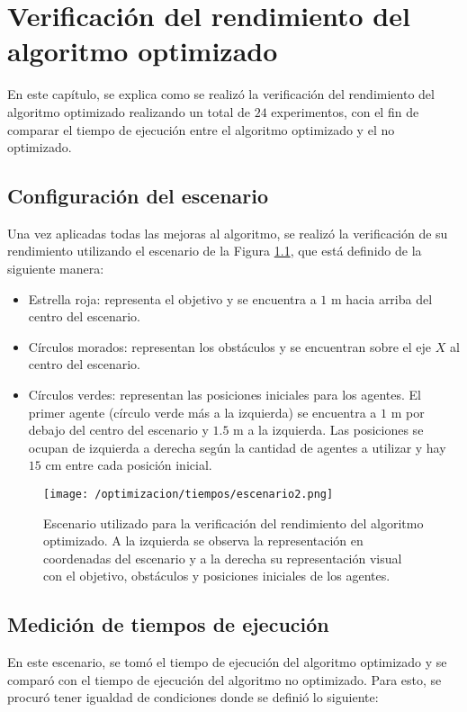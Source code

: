 \chapter{Verificación del rendimiento del algoritmo optimizado} \label{cap:verificacion_optim}
En este capítulo, se explica como se realizó la verificación del rendimiento del algoritmo optimizado realizando un total de $24$ experimentos, con el fin de comparar el tiempo de ejecución entre el algoritmo optimizado y el no optimizado.

\section{Configuración del escenario}
Una vez aplicadas todas las mejoras al algoritmo, se realizó la verificación de su rendimiento utilizando el escenario de la Figura \ref{fig:escenario_optimizacion}, que está definido de la siguiente manera:
\begin{itemize}
	\item Estrella roja: representa el objetivo y se encuentra a $1$ m hacia arriba del centro del escenario.
	\item Círculos morados: representan los obstáculos y se encuentran sobre el eje $X$ al centro del escenario.
	\item Círculos verdes: representan las posiciones iniciales para los agentes. El primer agente (círculo verde más a la izquierda) se encuentra a $1$ m por debajo del centro del escenario y $1.5$ m a la izquierda. Las posiciones se ocupan de izquierda a derecha según la cantidad de agentes a utilizar y hay $15$ cm entre cada posición inicial.
\end{itemize}

\begin{figure}[H]
	\centering
	\texttt{[image: /optimizacion/tiempos/escenario2.png]}
	\caption{Escenario utilizado para la verificación del rendimiento del algoritmo optimizado. A la izquierda se observa la representación en coordenadas del escenario y a la derecha su representación visual con el objetivo, obstáculos y posiciones iniciales de los agentes.}
	\label{fig:escenario_optimizacion}
\end{figure}

\section{Medición de tiempos de ejecución}
En este escenario, se tomó el tiempo de ejecución del algoritmo optimizado y se comparó con el tiempo de ejecución del algoritmo no optimizado. Para esto, se procuró tener igualdad de condiciones donde se definió lo siguiente:

